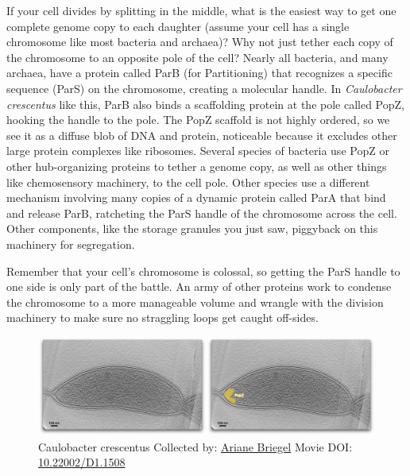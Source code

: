 \documentclass[]{tufte-book}
\begin{document}
If your cell divides by splitting in the middle, what is the easiest way
to get one complete genome copy to each daughter (assume your cell has a
single chromosome like most bacteria and archaea)? Why not just tether
each copy of the chromosome to an opposite pole of the cell? Nearly all
bacteria, and many archaea, have a protein called ParB (for
Partitioning) that recognizes a specific sequence (ParS) on the
chromosome, creating a molecular handle. In \emph{Caulobacter
crescentus} like this, ParB also binds a scaffolding protein at the pole
called PopZ, hooking the handle to the pole. The PopZ scaffold is not
highly ordered, so we see it as a diffuse blob of DNA and protein,
noticeable because it excludes other large protein complexes like
ribosomes. Several species of bacteria use PopZ or other hub-organizing
proteins to tether a genome copy, as well as other things like
chemosensory machinery, to the cell pole. Other species use a different
mechanism involving many copies of a dynamic protein called ParA that
bind and release ParB, ratcheting the ParS handle of the chromosome
across the cell. Other components, like the storage granules you just
saw, piggyback on this machinery for segregation.

Remember that your cell's chromosome is colossal, so getting the ParS
handle to one side is only part of the battle. An army of other proteins
work to condense the chromosome to a more manageable volume and wrangle
with the division machinery to make sure no straggling loops get caught
off-sides.





\begin{figure}
\includegraphics{movie_stills/5_2} \caption[Caulobacter crescentus Collected by:
\protect\hyperlink{ariane_briegel}{Ariane Briegel} Movie DOI:
\href{https://doi.org/10.22002/D1.1508}{10.22002/D1.1508}]{Caulobacter crescentus Collected by:
\protect\hyperlink{ariane_briegel}{Ariane Briegel} Movie DOI:
\href{https://doi.org/10.22002/D1.1508}{10.22002/D1.1508}}\label{fig:5-2}
\end{figure}
\end{document}
